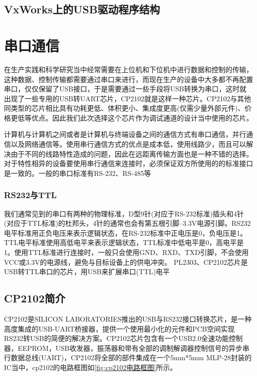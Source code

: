 \subsection{VxWorks上的USB驱动程序结构}




\section{串口通信}
	在生产实践和科学研究当中经常需要在上位机和下位机中进行数据和控制的传输，这种数据、控制传输都需要通过串口来进行，而现在生产的设备中大多都不再配置串口，仅仅保留了USB接口，于是需要通过一些手段将USB转换为串口，这时就出现了一些专用的USB转UART芯片，CP2102就是这样一种芯片。CP2102与其他同类型的芯片相比具有功耗更低、体积更小、集成度更高(仅需少量外部元件)、价格更低等优点。因此我们此次选择这个芯片作为调试通道的设计当中使用的芯片。

	计算机与计算机之间或者是计算机与终端设备之间的通信方式有串口通信，并行通信以及网络通信等。使用串行通信方式的优点是成本低，使用线路少，而且可以解决由于不同的线路特性造成的问题，因此在远距离传输方面也是一种不错的选择。对于特性相异的设备要使用串行通信来连接时，必须保证双方所使用的的标准接口是一致的。一般的串口标准有RS-232、RS-485等

\subsubsection{RS232与TTL}
	我们通常见到的串口有两种的物理标准，D型9针(对应于RS-232标准)插头和4针(对应于TTL标准)的杜邦头，4针的通常也会有第五根引脚--3.3V电源引脚。RS232电平标准用正负电压来表示逻辑状态，在RS-232标准中正电压是0，负电压是1。TTL电平标准使用高低电平来表示逻辑状态，TTL标准中低电平是0，高电平是1。使用TTL标准进行连接时，一般只会使用GND、RXD、TXD引脚，不会使用VCC或3.3V的电源线，避免与目标设备上的供电冲突。
	PL2303、CP2102芯片是USB转TTL串口的芯片，用USB来扩展串口(TTL)电平
	
 
\subsection{CP2102简介}
	CP2102是SILICON LABORATORIES推出的USB与RS232接口转换芯片，是一种高度集成的USB-UART桥接器，提供一个使用最小化的元件和PCB空间实现RS232转USB的简便的解决方案。CP2102芯片包含有一个USB2.0全速功能控制器，EEPROM，USB收发器，振荡器和带有全部的调制解调器控制信号的异步串行数据总线(UART)，CP2102将全部的部件集成在一个5mm*5mm MLP-28封装的IC当中\cite{CP2102}，cp2102的电路框图如\autoref{fig:cp2102电路框图}所示。


